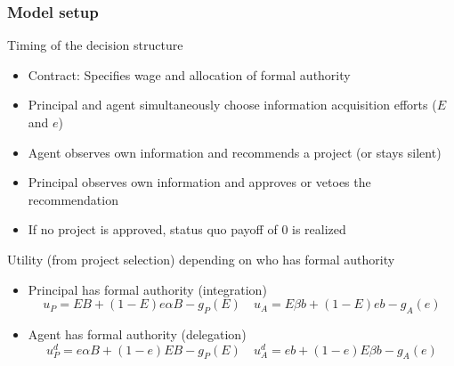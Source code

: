 \documentclass[aspectratio=169]{beamer}
\begin{document}
\begin{frame}
\frametitle{Model setup} 
Timing of the decision structure
\begin{itemize}\setlength\itemsep{3pt}
\item Contract: Specifies wage and allocation of formal authority
\item Principal and agent simultaneously choose information acquisition efforts ($E$ and $e$)
\item Agent observes own information and recommends a project (or stays silent)
\item Principal observes own information and approves or vetoes the recommendation
\item If no project is approved, status quo payoff of 0 is realized
\end{itemize}\medskip
Utility (from project selection) depending on who has formal authority
\begin{itemize}\setlength\itemsep{3pt}
  \item Principal has formal authority (integration)\vspace{-10pt}
  \[
  u_P =  EB + (1-E)e\alpha B - g_P(E) \quad u_A = E\beta b + (1-E)eb-g_A(e)
  \]\vspace{-20pt}
  \item Agent has formal authority (delegation)\vspace{-10pt}
\[
  u_P^d =  e\alpha B + (1-e)EB - g_P(E) \quad u_A^d = e b + (1-e)E\beta b-g_A(e)
  \]\vspace{-20pt}
\end{itemize}
\end{frame}
\end{document}
